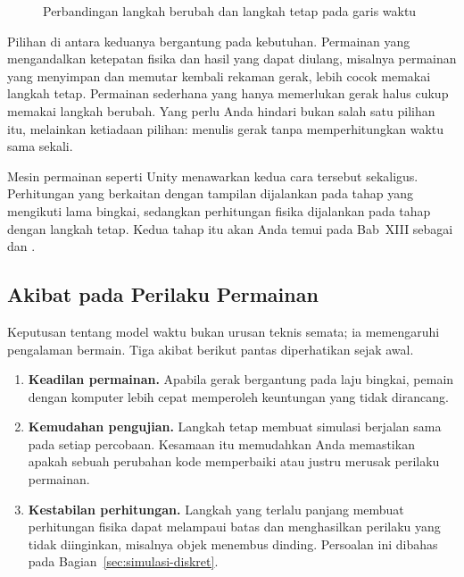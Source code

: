 \begin{figure}[htbp]
\centering

\caption{Perbandingan langkah berubah dan langkah tetap pada garis waktu}
\label{fig:waktu-bingkai}
\end{figure}

Pilihan di antara keduanya bergantung pada kebutuhan. Permainan yang
mengandalkan ketepatan fisika dan hasil yang dapat diulang, misalnya permainan
yang menyimpan dan memutar kembali rekaman gerak, lebih cocok memakai langkah
tetap. Permainan sederhana yang hanya memerlukan gerak halus cukup memakai
langkah berubah. Yang perlu Anda hindari bukan salah satu pilihan itu,
melainkan ketiadaan pilihan: menulis gerak tanpa memperhitungkan waktu sama
sekali.

\begin{catatabox}
Mesin permainan seperti Unity menawarkan kedua cara tersebut sekaligus.
Perhitungan yang berkaitan dengan tampilan dijalankan pada tahap yang
mengikuti lama bingkai, sedangkan perhitungan fisika dijalankan pada tahap
dengan langkah tetap. Kedua tahap itu akan Anda temui pada Bab~XIII sebagai
 dan .
\end{catatabox}

\subsection{Akibat pada Perilaku Permainan}

Keputusan tentang model waktu bukan urusan teknis semata; ia memengaruhi
pengalaman bermain. Tiga akibat berikut pantas diperhatikan sejak awal.

\begin{enumerate}
  \item \textbf{Keadilan permainan.} Apabila gerak bergantung pada laju
        bingkai, pemain dengan komputer lebih cepat memperoleh keuntungan yang
        tidak dirancang.
  \item \textbf{Kemudahan pengujian.} Langkah tetap membuat simulasi berjalan
        sama pada setiap percobaan. Kesamaan itu memudahkan Anda memastikan
        apakah sebuah perubahan kode memperbaiki atau justru merusak perilaku
        permainan.
  \item \textbf{Kestabilan perhitungan.} Langkah yang terlalu panjang membuat
        perhitungan fisika dapat melampaui batas dan menghasilkan perilaku yang
        tidak diinginkan, misalnya objek menembus dinding. Persoalan ini
        dibahas pada Bagian~\ref{sec:simulasi-diskret}.
\end{enumerate}
